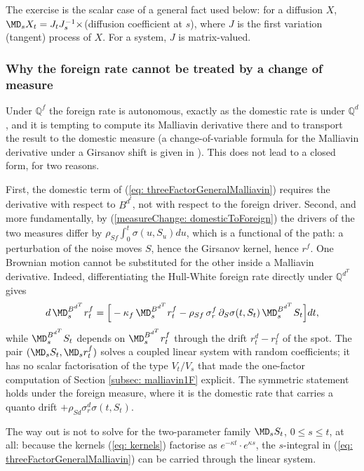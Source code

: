 
The exercise is the scalar case of a general fact used below: for a diffusion $X$, $\MD_sX_t=J_tJ_s^{-1}\times$(diffusion coefficient at $s$), where $J$ is the first variation (tangent) process of $X$. For a system, $J$ is matrix-valued.

\subsubsection{Why the foreign rate cannot be treated by a change of measure}\label{subsubsec: obstacle}
Under $\mathbb{Q}^{f}$ the foreign rate is autonomous, exactly as the domestic rate is under $\mathbb{Q}^d$, and it is tempting to compute its Malliavin derivative there and to transport the result to the domestic measure (a change-of-variable formula for the Malliavin derivative under a Girsanov shift is given in \cite{ewald}). This does not lead to a closed form, for two reasons.

First, the domestic term of (\ref{eq: threeFactorGeneralMalliavin}) requires the derivative with respect to $B^{d^t}$, not with respect to the foreign driver.
Second, and more fundamentally, by (\ref{measureChange: domesticToForeign}) the drivers of the two measures differ by $\rho_{Sf}\int_0^t\sigma(u,S_u)du$, which is a functional of the path: a perturbation of the noise moves $S$, hence the Girsanov kernel, hence $r^f$. One Brownian motion cannot be substituted for the other inside a Malliavin derivative. Indeed, differentiating the Hull-White foreign rate directly under $\mathbb{Q}^{d^T}$ gives
$$ d\,\MD^{B^{d^T}}_sr^f_t=\Big[-\kappa_f\,\MD^{B^{d^T}}_sr^f_t-\rho_{Sf}\,\sigma^f_r\,\partial_S\sigma(t,S_t)\,\MD^{B^{d^T}}_sS_t\Big]dt, $$
while $\MD^{B^{d^T}}_sS_t$ depends on $\MD^{B^{d^T}}_sr^f_t$ through the drift $r^d_t-r^f_t$ of the spot. The pair $(\MD_sS_t,\MD_sr^f_t)$ solves a coupled linear system with random coefficients; it has no scalar factorisation of the type $V_t/V_s$ that made the one-factor computation of Section \ref{subsec: malliavin1F} explicit. The symmetric statement holds under the foreign measure, where it is the domestic rate that carries a quanto drift $+\rho_{Sd}\sigma^d_r\sigma(t,S_t)$.

The way out is not to solve for the two-parameter family $\MD_sS_t$, $0\leq s\leq t$, at all: because the kernels (\ref{eq: kernels}) factorise as $e^{-\kappa t}\cdot e^{\kappa s}$, the $s$-integral in (\ref{eq: threeFactorGeneralMalliavin}) can be carried through the linear system.


